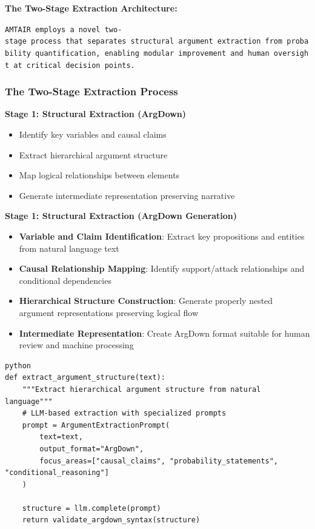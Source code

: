 \documentclass[
  11pt,
  letterpaper,
]{book}
\providecommand{\tightlist}{%
  \setlength{\itemsep}{0pt}\setlength{\parskip}{0pt}}
\begin{document}
\textbf{The Two-Stage Extraction Architecture:}

\texttt{AMTAIR\ employs\ a\ novel\ two-stage\ process\ that\ separates\ structural\ argument\ extraction\ from\ probability\ quantification,\ enabling\ modular\ improvement\ and\ human\ oversight\ at\ critical\ decision\ points.}

\subsubsection{The Two-Stage Extraction
Process}\label{sec-two-stage-extraction}

\textbf{Stage 1: Structural Extraction (ArgDown)}

\begin{itemize}
\tightlist
\item
  Identify key variables and causal claims
\item
  Extract hierarchical argument structure
\item
  Map logical relationships between elements
\item
  Generate intermediate representation preserving narrative
\end{itemize}

\textbf{Stage 1: Structural Extraction (ArgDown Generation)}

\begin{itemize}
\tightlist
\item
  \textbf{Variable and Claim Identification}: Extract key propositions
  and entities from natural language text
\item
  \textbf{Causal Relationship Mapping}: Identify support/attack
  relationships and conditional dependencies
\item
  \textbf{Hierarchical Structure Construction}: Generate properly nested
  argument representations preserving logical flow
\item
  \textbf{Intermediate Representation}: Create ArgDown format suitable
  for human review and machine processing
\end{itemize}

\begin{verbatim}
python
def extract_argument_structure(text):
    """Extract hierarchical argument structure from natural language"""
    # LLM-based extraction with specialized prompts
    prompt = ArgumentExtractionPrompt(
        text=text,
        output_format="ArgDown",
        focus_areas=["causal_claims", "probability_statements", "conditional_reasoning"]
    )
    
    structure = llm.complete(prompt)
    return validate_argdown_syntax(structure)
\end{verbatim}
\end{document}
